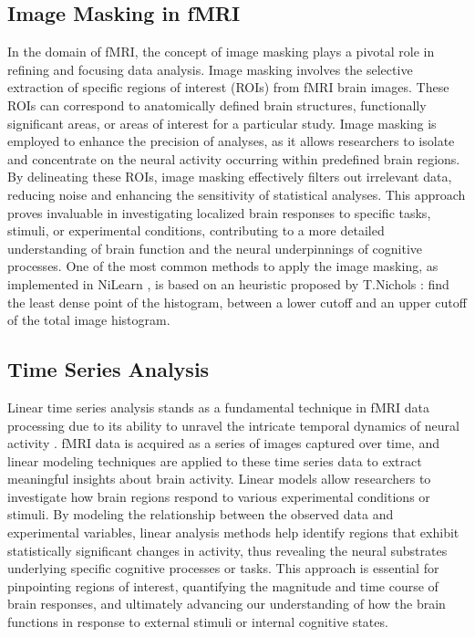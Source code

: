 \subsection{Image Masking in fMRI}

In the domain of fMRI, the concept of image masking plays a pivotal role in refining and focusing data analysis. Image masking involves the selective extraction of specific regions of interest (ROIs) from fMRI brain images. These ROIs can correspond to anatomically defined brain structures, functionally significant areas, or areas of interest for a particular study. Image masking is employed to enhance the precision of analyses, as it allows researchers to isolate and concentrate on the neural activity occurring within predefined brain regions. By delineating these ROIs, image masking effectively filters out irrelevant data, reducing noise and enhancing the sensitivity of statistical analyses. This approach proves invaluable in investigating localized brain responses to specific tasks, stimuli, or experimental conditions, contributing to a more detailed understanding of brain function and the neural underpinnings of cognitive processes. One of the most common methods to apply the image masking, as implemented in NiLearn \cite{abraham2014machine}, is based on an heuristic proposed by T.Nichols \cite{luo2003diagnosis}: find the least dense point of the histogram, between a lower cutoff and an upper cutoff of the total image histogram.

\subsection{Time Series Analysis}

Linear time series analysis stands as a fundamental technique in fMRI data processing due to its ability to unravel the intricate temporal dynamics of neural activity \cite{friston1994statistical}. fMRI data is acquired as a series of images captured over time, and linear modeling techniques are applied to these time series data to extract meaningful insights about brain activity. Linear models allow researchers to investigate how brain regions respond to various experimental conditions or stimuli. By modeling the relationship between the observed data and experimental variables, linear analysis methods help identify regions that exhibit statistically significant changes in activity, thus revealing the neural substrates underlying specific cognitive processes or tasks. This approach is essential for pinpointing regions of interest, quantifying the magnitude and time course of brain responses, and ultimately advancing our understanding of how the brain functions in response to external stimuli or internal cognitive states.

